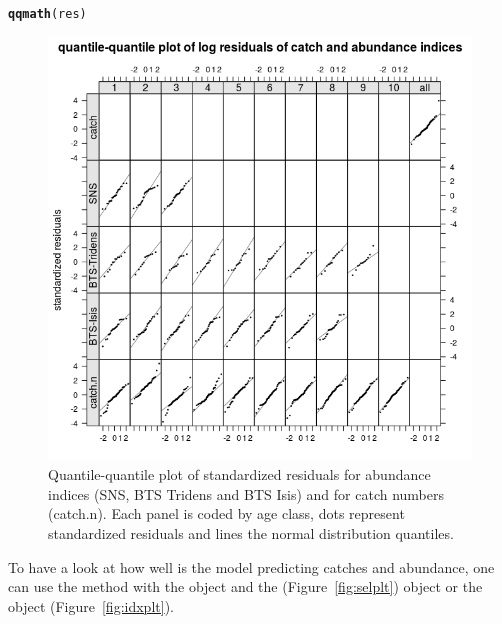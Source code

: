 \documentclass[a4paper,english,10pt]{article}\usepackage[]{graphicx}\usepackage[]{color}
\makeatletter
\def\maxwidth{ %
  \ifdim\Gin@nat@width>\linewidth
    \linewidth
  \else
    \Gin@nat@width
  \fi
}
\newcommand{\hlstd}[1]{\textcolor[rgb]{0.345,0.345,0.345}{#1}}%
\newcommand{\hlkwd}[1]{\textcolor[rgb]{0.737,0.353,0.396}{\textbf{#1}}}%
\newenvironment{kframe}{%
 \def\at@end@of@kframe{}%
 \ifinner\ifhmode%
  \def\at@end@of@kframe{\end{minipage}}%
  \begin{minipage}{\columnwidth}%
 \fi\fi%
 \def\FrameCommand##1{\hskip\@totalleftmargin \hskip-\fboxsep
 \colorbox{shadecolor}{##1}\hskip-\fboxsep
     \hskip-\linewidth \hskip-\@totalleftmargin \hskip\columnwidth}%
 \MakeFramed {\advance\hsize-\width
   \@totalleftmargin\z@ \linewidth\hsize
   \@setminipage}}%
 {\par\unskip\endMakeFramed%
 \at@end@of@kframe}
\newenvironment{knitrout}{}{} %
\makeatother
\begin{document}
\begin{knitrout}
\color{fgcolor}\begin{kframe}
\begin{alltt}
\hlkwd{qqmath}\hlstd{(res)}
\end{alltt}
\end{kframe}\begin{figure}[H]

{\centering \includegraphics[width=\maxwidth]{figure/qq-1} 

}

\caption[Quantile-quantile plot of standardized residuals for abundance indices (SNS, BTS Tridens and BTS Isis) and for catch numbers (catch.n)]{Quantile-quantile plot of standardized residuals for abundance indices (SNS, BTS Tridens and BTS Isis) and for catch numbers (catch.n). Each panel is coded by age class, dots represent standardized residuals and lines the normal distribution quantiles.}\label{fig:qq}
\end{figure}


\end{knitrout}

To have a look at how well is the model predicting catches and abundance, one can use the  method with the  object and the  (Figure~\ref{fig:selplt}) object or the  object (Figure~\ref{fig:idxplt}).
\end{document}
